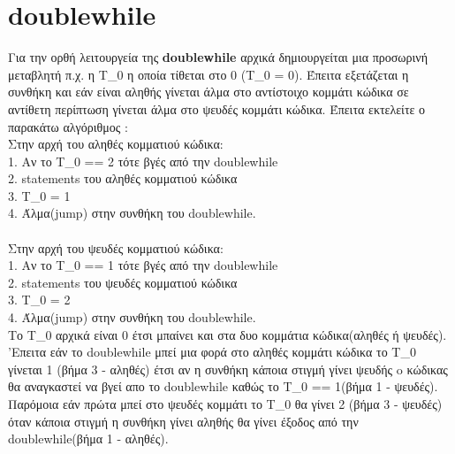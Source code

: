 \documentclass[12pt,a4paper,a4paper]{report}
\begin{document}
\section{doublewhile}
Για την ορθή λειτουργεία της \textbf{doublewhile} αρχικά δημιουργείται μια προσωρινή μεταβλητή π.χ. η Τ\_0 η οποία τίθεται στο 0 (Τ\_0 = 0). Έπειτα εξετάζεται η συνθήκη και εάν είναι αληθής γίνεται άλμα στο αντίστοιχο κομμάτι κώδικα σε αντίθετη περίπτωση γίνεται άλμα στο ψευδές κομμάτι κώδικα. Έπειτα εκτελείτε ο παρακάτω αλγόριθμος :\\
Στην αρχή του αληθές κομματιού κώδικα:\\
1. Αν το Τ\_0 == 2 τότε βγές από την doublewhile\\
2. statements του αληθές κομματιού κώδικα\\
3. Τ\_0 = 1\\
4. Άλμα(jump) στην συνθήκη του doublewhile.\\
\\Στην αρχή του ψευδές κομματιού κώδικα:\\
1. Αν το Τ\_0 == 1 τότε βγές από την doublewhile\\
2. statements του ψευδές κομματιού κώδικα\\
3. Τ\_0 = 2\\
4. Άλμα(jump) στην συνθήκη του doublewhile.\\
Το Τ\_0 αρχικά είναι 0 έτσι μπαίνει και στα δυο κομμάτια κώδικα(αληθές ή ψευδές). 'Επειτα εάν το doublewhile μπεί μια φορά στο αληθές κομμάτι κώδικα το Τ\_0 γίνεται 1 (βήμα 3 - αληθές) έτσι αν η συνθήκη κάποια στιγμή γίνει ψευδής o κώδικας θα αναγκαστεί να βγεί απο το doublewhile καθώς το Τ\_0 == 1(βήμα 1 - ψευδές). Παρόμοια εάν πρώτα μπεί στο ψευδές κομμάτι το Τ\_0 θα γίνει 2 (βήμα 3 - ψευδές) όταν κάποια στιγμή η συνθήκη γίνει αληθής θα γίνει έξοδος από την doublewhile(βήμα 1 - αληθές).
\end{document}
